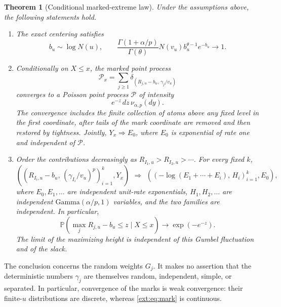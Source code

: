 \documentclass[11pt]{article}
\newtheorem{theorem}{Theorem}[section]
\theoremstyle{definition}
\theoremstyle{remark}
\begin{document}
\begin{theorem}[Conditional marked-extreme law]\label{ext:thm:main}
Under the assumptions above, the following statements hold.
\begin{enumerate}
\item The exact centering satisfies
\begin{equation}\label{ext:eq:basymp}
 b_u\sim\log N(u),\qquad
 \frac{\Gamma(1+\alpha/p)}{\Gamma(\theta)}
       N(v_u)b_u^{\theta-1}e^{-b_u}\longrightarrow1.
\end{equation}
\item Conditionally on $X\le x$, the marked point process
\begin{equation}\label{ext:eq:pointprocess}
 \mathcal P_x=\sum_{j\ge1}
       \delta_{(R_{j,u}-b_u,\,\gamma_j/v_u)}
\end{equation}
converges to a Poisson point process $\mathcal P$ of intensity
\[
 e^{-z}\,dz\,\nu_{\alpha,p}(dy).
\]
The convergence includes the finite collection of atoms above any fixed
level in the first coordinate, after tails of the mark coordinate are
removed and then restored by tightness.  Jointly,
$Y_x\Rightarrow E_0$, where $E_0$ is exponential of rate one and independent
of $\mathcal P$.
\item Order the contributions decreasingly as
$R_{I_1,u}>R_{I_2,u}>\cdots$.  For every fixed $k$,
\begin{equation}\label{ext:eq:topk}
 \left(
   \left(R_{I_i,u}-b_u,\,(\gamma_{I_i}/v_u)^p\right)_{i=1}^k,
   Y_x
 \right)
 \ \,\Longrightarrow\ \,
 \left(
   \left(-\log(E_1+\cdots+E_i),\,H_i\right)_{i=1}^k,
   E_0
 \right),
\end{equation}
where $E_0,E_1,\ldots$ are independent unit-rate exponentials,
$H_1,H_2,\ldots$ are independent $\mathrm{Gamma}(\alpha/p,1)$ variables,
and the two families are independent.  In particular,
\[
 \mathbb P\!\left(\max_jR_{j,u}-b_u\le z\mid X\le x\right)
 \longrightarrow \exp(-e^{-z}).
\]
The limit of the maximizing height is independent of this Gumbel
fluctuation and of the slack.
\end{enumerate}
\end{theorem}

The conclusion concerns the random weights $G_j$.  It makes no assertion
that the deterministic numbers $\gamma_j$ are themselves random,
independent, simple, or separated.  In particular, convergence of the
marks is weak convergence: their finite-$u$ distributions are discrete,
whereas \eqref{ext:eq:mark} is continuous.
\end{document}
